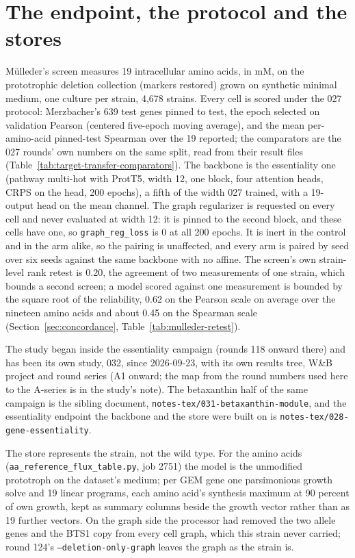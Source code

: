 \section{The endpoint, the protocol and the stores}
\label{sec:endpoint}

M\"ulleder's screen measures 19 intracellular amino acids, in mM, on the prototrophic
deletion collection (markers restored) grown on synthetic minimal medium, one culture
per strain, 4,678 strains. Every cell is scored under the 027 protocol: Merzbacher's 639
test genes pinned to test, the epoch selected on validation Pearson (centered five-epoch
moving average), and the mean per-amino-acid pinned-test Spearman over the 19 reported;
the comparators are the 027 rounds' own numbers on the same split, read from their
result files (Table~\ref{tab:target-transfer-comparators}). The backbone is the
essentiality one (pathway multi-hot with ProtT5, width 12, one block, four attention
heads, CRPS on the head, 200 epochs), a fifth of the width 027 trained, with a 19-output
head on the mean channel. The graph regularizer is requested on every cell and never
evaluated at width 12: it is pinned to the second block, and these cells have one, so
\texttt{graph\_reg\_loss} is 0 at all 200 epochs. It is inert in the control and in the
arm alike, so the pairing is unaffected, and every arm is paired by seed over six seeds
against the same backbone with no affine. The screen's own strain-level rank retest is
0.20, the agreement of two measurements of one strain, which bounds a second screen; a
model scored against one measurement is bounded by the square root of the reliability,
0.62 on the Pearson scale on average over the nineteen amino acids and about 0.45 on
the Spearman scale (Section~\ref{sec:concordance}, Table~\ref{tab:mulleder-retest}).

The study began inside the essentiality campaign (rounds 118 onward there) and has been
its own study, 032, since 2026-09-23, with its own results tree, W\&B project and round
series (A1 onward; the map from the round numbers used here to the A-series is in the
study's note). The betaxanthin half of the same campaign is the sibling document,
\texttt{notes-tex/031-betaxanthin-module}, and the essentiality endpoint the backbone and
the store were built on is \texttt{notes-tex/028-gene-essentiality}.

The store represents the strain, not the wild type. For the amino acids
(\texttt{aa\_reference\_flux\_table.py}, job 2751) the model is the unmodified prototroph
on the dataset's medium; per GEM gene one parsimonious growth solve and 19 linear
programs, each amino acid's synthesis maximum at 90 percent of own growth, kept as
summary columns beside the growth vector rather than as 19 further vectors. On the graph
side the processor had removed the two allele genes and the BTS1 copy from every cell
graph, which this strain never carried; round 124's \texttt{--deletion-only-graph}
leaves the graph as the strain is.
